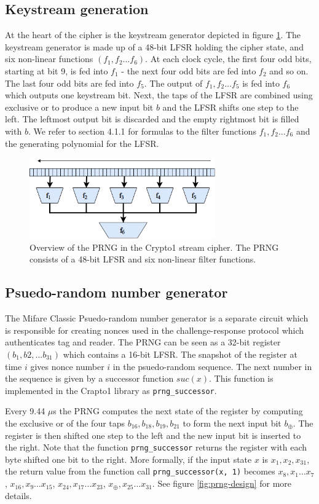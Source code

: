 \documentclass[10pt,twocolumn]{article}
\begin{document}
\subsection{Keystream generation}
At the heart of the cipher is the keystream generator depicted in figure \ref{fig:crapto-prng}. The keystream generator is made up of a 48-bit LFSR holding the cipher state, and six non-linear functions $(f_1, f_2\ldots f_6)$. At each clock cycle, the first four odd bits, starting at bit 9, is fed into $f_1$ - the next four odd bits are fed into $f_2$ and so on. The last four odd bits are fed into $f_5$. The output of $f_1, f_2\ldots f_5$ is fed into $f_6$ which outputs one keystream bit. Next, the taps of the LFSR are combined using exclusive or to produce a new input bit $b$ and the LFSR shifts one step to the left. The leftmost output bit is discarded and the empty rightmost bit is filled with $b$. We refer to \cite{tan09} section 4.1.1 for formulas to the filter functions $f_1, f_2\ldots f_6$ and the generating polynomial for the LFSR.

\begin{figure}
\includegraphics[width=8cm]{crapto1.png}
\caption{Overview of the PRNG in the Crypto1 stream cipher. The PRNG consists of a 48-bit LFSR and six non-linear filter functions.}
\label{fig:crapto-prng}
\end{figure}

\subsection{Psuedo-random number generator}
The Mifare Classic Psuedo-random number generator is a separate circuit which is responsible for creating nonces used in the challenge-response protocol which authenticates tag and reader. The PRNG can be seen as a 32-bit register $(b_1, b2, \ldots b_{31})$ which contains a 16-bit LFSR. The snapshot of the register at time $i$ gives nonce number $i$ in the psuedo-random sequence. The next number in the sequence is given by a successor function $suc(x)$. This function is implemented in the Crapto1 library as \verb!prng_successor!.

Every 9.44 $\mu$s the PRNG computes the next state of the register by computing the exclusive or of the four taps $b_{16}, b_{18}, b_{19}, b_{21}$ to form the next input bit $b_\oplus$. The register is then shifted one step to the left and the new input bit is inserted to the right. Note that the function \verb!prng_successor! returns the register with each byte shifted one bit to the right. More formally, if the input state $x$ is $x_1, x_2, x_{31}$, the return value from the function call \verb!prng_successor(x, 1)! becomes $x_8, x_1\ldots x_7$, $x_{16}, x_9\ldots x_{15}$, $x_{24}, x_{17}\ldots x_{23}$, $x_\oplus, x_{25}\ldots x_{31}$. See figure \ref{fig:prng-design} for more details.
\end{document}
